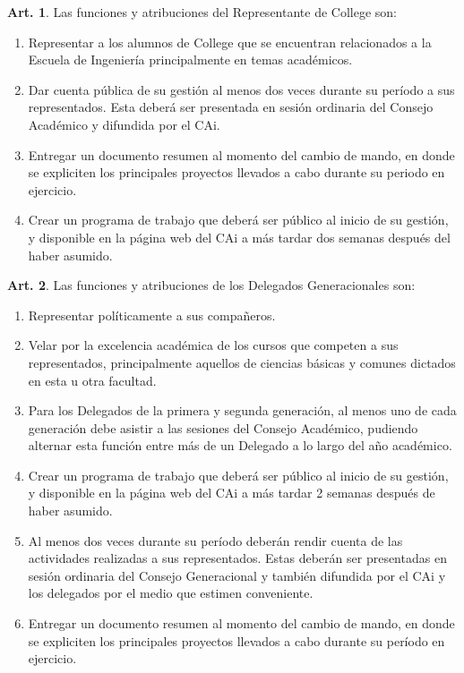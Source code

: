 \documentclass[letterpaper,11pt]{article}
\theoremstyle{definition}%
\newtheorem{art}{Art.} %
\begin{document}
\begin{art}\label{representanteCollege}
	Las funciones y atribuciones del Representante de College son:
	\begin{enumerate}
		\item Representar a los alumnos de College que se encuentran relacionados a la Escuela de Ingeniería principalmente en temas académicos.
		\item Dar cuenta pública de su gestión al menos dos veces durante su período a sus representados. Esta deberá ser presentada en sesión ordinaria del Consejo Académico y difundida por el CAi.
		\item Entregar un documento resumen al momento del cambio de mando, en donde se expliciten los principales proyectos llevados a cabo durante su periodo en ejercicio.
		\item Crear un programa de trabajo que deberá ser público al inicio de su gestión, y disponible en la página web del CAi a más tardar dos semanas después del haber asumido.
	\end{enumerate}
\end{art}

\begin{art}\label{funcionesDelegadosGeneracionales}
	Las funciones y atribuciones de los Delegados Generacionales son:
	\begin{enumerate}
		\item Representar políticamente a sus compañeros.
		\item Velar por la excelencia académica de los cursos que competen a sus representados, principalmente aquellos de ciencias básicas y comunes dictados en esta u otra facultad.
		\item Para los Delegados de la primera y segunda generación, al menos uno de cada generación debe asistir a las sesiones del Consejo Académico, pudiendo alternar esta función entre más de un Delegado a lo largo del año académico.
		\item Crear un programa de trabajo que deberá ser público al inicio de su gestión, y disponible en la página web del CAi a más tardar 2 semanas después de haber asumido.
		\item \label{cuentaPublica} Al menos dos veces durante su período deberán rendir cuenta de las actividades realizadas a sus representados. Estas deberán ser presentadas en sesión ordinaria del Consejo Generacional y también difundida por el CAi  y los delegados por el medio que estimen conveniente.
		\item Entregar un documento resumen al momento del cambio de mando, en donde se expliciten los principales proyectos llevados a cabo durante su período en ejercicio.
	\end{enumerate}
\end{art}
\end{document}
